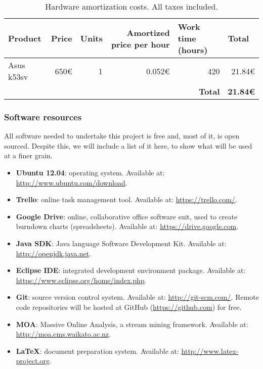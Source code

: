 \begin{table}[h]
	\centering
	\begin{tabular}{l r r r r r}
		\hline
		\textbf{Product} & \multicolumn{1}{l}{\textbf{Price}} & \multicolumn{1}{l}{\textbf{Units}} & \multicolumn{1}{p{3cm}}{\textbf{Amortized price per hour}} & \multicolumn{1}{l}{\textbf{Work time (hours)}} & \multicolumn{1}{l}{\textbf{Total}} \\ \hline
		Asus k53sv & 650€ & 1 & 0.052€ & 420 & 21.84€ \\ \hline
		&  &  &  & \textbf{Total} & \textbf{21.84€}
	\end{tabular}
	\caption{Hardware amortization costs. All taxes included.}
	\label{table:hardware-resources}
\end{table}

\subsubsection{Software resources}

All software needed to undertake this project is free and, most of it, is open sourced. Despite this, we will include a list of it here, to show what will be used at a finer grain.

\begin{itemize}
	\item \textbf{Ubuntu 12.04}: operating system. Available at: \url{http://www.ubuntu.com/download}.
	\item \textbf{Trello}: online task management tool. Available at: \url{https://trello.com/}.
	\item \textbf{Google Drive}: online, collaborative office software suit, used to create burndown charts (spreadsheets). Available at: \url{https://drive.google.com}.
	\item \textbf{Java SDK}: Java language Software Development Kit. Available at: \url{http://openjdk.java.net}.
	\item \textbf{Eclipse IDE}: integrated development environment package. Available at: \url{https://www.eclipse.org/home/index.php}.
	\item \textbf{Git}: source version control system. Available at: \url{http://git-scm.com/}. Remote code repositories will be hosted at GitHub (\url{https://github.com}) for free.
	\item \textbf{MOA}: Massive Online Analysis, a stream mining framework. Available at: \url{http://moa.cms.waikato.ac.nz}.
	\item \textbf{\LaTeX}: document preparation system. Available at: \url{http://www.latex-project.org}.
\end{itemize}

